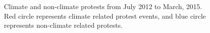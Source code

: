 \documentclass[9pt,twocolumn,twoside]{pnas-new}
\begin{document}
\begin{figure}[ht]
	\centering
	\caption{Climate and non-climate protests from July 2012 to March, 2015. Red circle represents climate related protest events, and blue circle represents non-climate related protests. }
\label{climate-map}
\end{figure}


\end{document}

